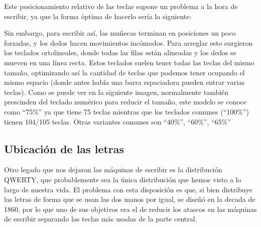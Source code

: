   Este posicionamiento relativo de las teclas supone un problema a la hora de escribir, ya que la forma óptima de hacerlo sería la siguiente:
  
  Sin embargo, para escribir así, las muñecas terminan en posiciones un poco forzadas, y los dedos hacen movimientos incómodos. Para arreglar esto surgieron los teclados ortolineales, donde todas las filas están alineadas y los dedos se mueven en una línea recta. Estos teclados suelen tener todas las teclas del mismo tamaño, optimizando así la cantidad de teclas que podemos tener ocupando el mismo espacio (donde antes había una barra espaciadora pueden entrar varias teclas). Como se puede ver en la siguiente imagen, normalmente también prescinden del teclado numérico para reducir el tamaño, este modelo se conoce como ``75\%'' ya que tiene 75 teclas mientras que los teclados comunes (``100\%'') tienen 104/105 teclas. Otras variantes comunes son ``40\%'', ``60\%'', ``65\%'' 

  \subsection{Ubicación de las letras}
  Otro legado que nos dejaron las máquinas de escribir es la distribución QWERTY, que probablemente sea la única distribución que hemos visto a lo largo de nuestra vida. El problema con esta disposición es que, si bien distribuye las letras de forma que se usan las dos manos por igual, se diseñó en la decada de 1860, por lo que uno de sus objetivos era el de reducir los atascos en las máquinas de escribir separando las teclas más usadas de la parte central. 

